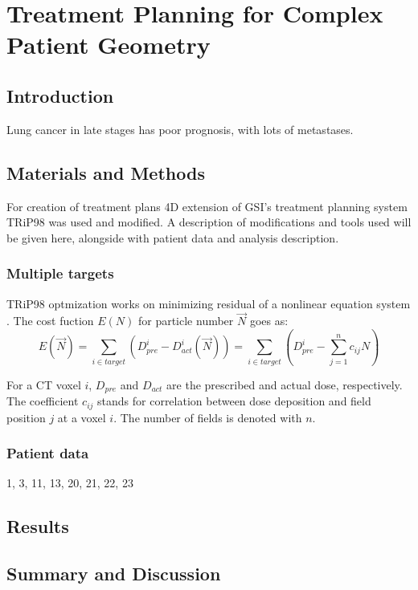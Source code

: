\documentclass[type=dr, dr=rernat, accentcolor=tud7b,colorbacktitle, bigchapter, openright, twoside, 12pt ]{tudthesis}
\begin{document}
\chapter{Treatment Planning for Complex Patient Geometry}
\label{chapter:vmm}
\minitoc

\section{Introduction}

Lung cancer in late stages has poor prognosis, with lots of metastases.

\section{Materials and Methods}

For creation of treatment plans 4D extension of GSI's treatment planning system TRiP98 \cite{Kraemer2000a, Richter2013} was used and modified. A description of modifications and tools used will be given here, 
alongside with patient data and analysis description.

\subsection{Multiple targets}

TRiP98 optmization works on minimizing residual of a nonlinear equation system \cite{Kraemer2000a}. The cost fuction $E(N)$ for particle number $\vec{N}$ goes as:
\begin{equation}
 E(\vec{N}) = \sum_{i\in target} \left( D_{pre}^{i} - D_{act}^{i}(\vec{N})\right) = \sum_{i\in target} \left( D_{pre}^{i} -\sum_{j=1}^n c_{ij}N\right)
\end{equation}

For a CT voxel $i$, $ D_{pre}$ and $D_{act}$ are the prescribed and actual dose, respectively. The coefficient $c_{ij}$ stands for correlation between dose deposition and field position $j$ at a voxel $i$. The number of fields is denoted with $n$.



\subsection{Patient data}



1, 3, 11, 13, 20, 21, 22, 23

\section{Results}

\section{Summary and Discussion}






{}
% 
\end{document}

